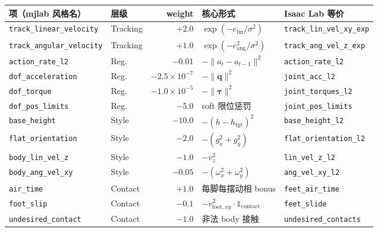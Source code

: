 \begin{center}
\small
\begin{tabular}{@{}llrll@{}}
\toprule
项（mjlab 风格名） & 层级 & weight & 核心形式 & Isaac Lab 等价 \\
\midrule
\verb|track_linear_velocity| & Tracking & $+2.0$ & $\exp(-e_{\text{lin}}/\sigma^2)$ & \verb|track_lin_vel_xy_exp| \\
\verb|track_angular_velocity| & Tracking & $+1.0$ & $\exp(-e_{\text{ang}}^2/\sigma^2)$ & \verb|track_ang_vel_z_exp| \\
\verb|action_rate_l2| & Reg. & $-0.01$ & $-\lVert a_t-a_{t-1}\rVert^2$ & \verb|action_rate_l2| \\
\verb|dof_acceleration| & Reg. & $-2.5\!\times\!10^{-7}$ & $-\lVert\ddot{\mathbf q}\rVert^2$ & \verb|joint_acc_l2| \\
\verb|dof_torque| & Reg. & $-1.0\!\times\!10^{-5}$ & $-\lVert\boldsymbol\tau\rVert^2$ & \verb|joint_torques_l2| \\
\verb|dof_pos_limits| & Reg. & $-5.0$ & soft 限位惩罚 & \verb|joint_pos_limits| \\
\verb|base_height| & Style & $-10.0$ & $-(h-h_{\text{tgt}})^2$ & \verb|base_height_l2| \\
\verb|flat_orientation| & Style & $-2.0$ & $-(g_x^2+g_y^2)$ & \verb|flat_orientation_l2| \\
\verb|body_lin_vel_z| & Style & $-1.0$ & $-v_z^2$ & \verb|lin_vel_z_l2| \\
\verb|body_ang_vel_xy| & Style & $-0.05$ & $-(\omega_x^2+\omega_y^2)$ & \verb|ang_vel_xy_l2| \\
\verb|air_time| & Contact & $+1.0$ & 每脚每摆动相 bonus & \verb|feet_air_time| \\
\verb|foot_slip| & Contact & $-0.1$ & $-v_{\text{foot},xy}^2\!\cdot\!\mathbb 1_{\text{contact}}$ & \verb|feet_slide| \\
\verb|undesired_contact| & Contact & $-1.0$ & 非法 body 接触 & \verb|undesired_contacts| \\
\bottomrule
\end{tabular}
\end{center}


